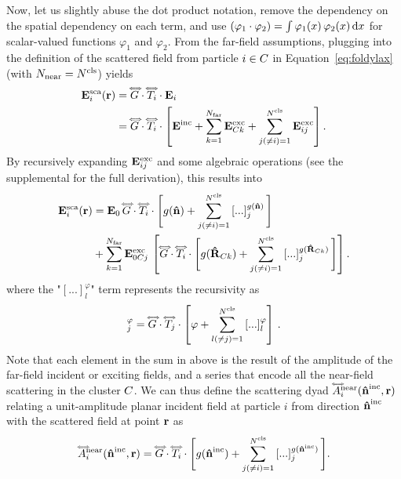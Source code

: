 Now, let us slightly abuse the dot product notation, remove the dependency on the spatial dependency on each term, and use $(\varphi_1 \cdot \varphi_2) = \int \varphi_1(x)\,\varphi_2(x) \,\text{d}x$ for scalar-valued functions $\varphi_1$ and $\varphi_2$. From the far-field assumptions, plugging  into the definition of the scattered field from particle $i\in C$ in Equation~\eqref{eq:foldylax} (with ${N_{\text{near}}}={N^\text{cls}}$) yields
\begin{equation}
    \label{eq:scafieldcluster1}
    \begin{split}
        \mathbf{E}^\text{sca}_i(\mathbf{r}) &= \accentset{\Longleftrightarrow}{G} \cdot \accentset{\Longleftrightarrow}{T}_i\cdot \mathbf{E}_i\\
        & = \accentset{\Longleftrightarrow}{G} \cdot \accentset{\Longleftrightarrow}{T}_i \cdot \left[\mathbf{E}^\text{inc} + \sum_{k=1}^{N_{\text{far}}} \mathbf{E}^\text{exc}_{C k}+ \sum_{j(\neq i)=1}^{N^\text{cls}} \mathbf{E}^\text{exc}_{ij} \right].
    \end{split}        
\end{equation}
By recursively expanding $\mathbf{E}^\text{exc}_{ij}$ and some algebraic operations (see the supplemental for the full derivation), this results into 
\begin{align}
    \label{eq:scafieldcluster5}
    \mathbf{E}^\text{sca}_i(\mathbf{r}) &= \mathbf{E}_0 \, \accentset{\Longleftrightarrow}{G} \cdot \accentset{\Longleftrightarrow}{T}_i \cdot \Bigg[ g(\mathbf{\hat{n}}) + \sum_{j(\neq i)=1}^{N^\text{cls}} \left[...\right]_j^{g(\mathbf{\hat{n}})} \Bigg] \\
    & + \sum_{k=1}^{N_{\text{far}}} \mathbf{E}^\text{exc}_{0C j}\,\left[ \accentset{\Longleftrightarrow}{G} \cdot \accentset{\Longleftrightarrow}{T}_i \cdot \Bigg[ g(\mathbf{\hat{R}}_{C k}) + \sum_{j(\neq i)=1}^{N^\text{cls}} \left[...\right]_j^{g(\mathbf{\hat{R}}_{C k})}\Bigg]\right]. \nonumber 
\end{align}
where the "$[...]_l^\varphi$" term represents the recursivity as
\begin{equation}
    [...]_j^\varphi= \sGreen \cdot \dyad{T}_j \cdot \left[\varphi + \sum_{l(\neq j)=1}^\Ncls \left[...\right]_l^\varphi\right] \,.
\end{equation}
Note that each element in the sum in  above is the result of the amplitude of the far-field incident or exciting fields, and a series that encode all the near-field scattering in the cluster $C$. We can thus define the scattering dyad $\accentset{\Longleftrightarrow}{A}_i^\text{near}(\mathbf{\hat{n}}^{\text{inc}},\mathbf{r})$ relating a unit-amplitude planar incident field at particle $i$ from direction $\mathbf{\hat{n}}^{\text{inc}}$ with the scattered field at point $\mathbf{r}$ as
\begin{equation}
    \accentset{\Longleftrightarrow}{A}_i^\text{near}(\mathbf{\hat{n}}^{\text{inc}},\mathbf{r}) = \accentset{\Longleftrightarrow}{G} \cdot \accentset{\Longleftrightarrow}{T}_i\cdot \Bigg[ g(\mathbf{\hat{n}}^{\text{inc}}) + \sum_{j(\neq i)=1}^{N^\text{cls}} \left[...\right]_j^{g(\mathbf{\hat{n}}^{\text{inc}})} \Bigg].
    \label{eq:scatdyad_near}
\end{equation}
